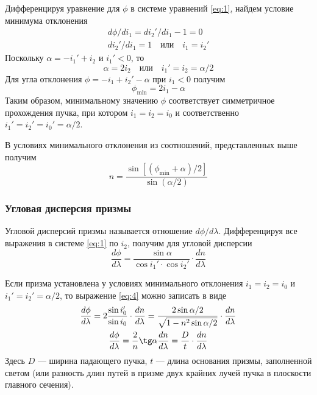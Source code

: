 \documentclass[a4paper, 12pt]{article}
\begin{document}
Дифференцируя уравнение для $\phi$ в системе уравнений \eqref{eq:1},
найдем условие минимума отклонения
\begin{equation*}
    \begin{aligned}
        d\phi/di_1 = di_2'/di_1 - 1 = 0 \\
        di_2'/di_1 = 1\quad \text{или}\quad i_1 = i_2'
    \end{aligned}
\end{equation*}
Поскольку $\alpha = -i_1'+i_2$ и $i_1' < 0$, то
\[
    \alpha = 2i_2\quad \text{или}\quad i_1' = i_2 = \alpha/2
\]
Для угла отклонения $\phi = -i_1 + i_2' - \alpha$ при $i_1 < 0$ получим
\begin{equation}
    \phi_\text{min} = 2i_1 - \alpha
    \label{eq:2}
\end{equation}
Таким образом, минимальному значению $\phi$ соответствует симметричное
прохождения пучка, при котором $i_1=i_2=i_0$ и соответственно
$i_1'=i_2'=i_0' = \alpha/2$.

В условиях минимального отклонения из соотношений, представленных выше
получим
\begin{equation}
    n = \frac{\sin \left[(\phi_\text{min} + \alpha)/2
    \right]}{\sin(\alpha/2)}
    \label{eq:3}
\end{equation}

\subsubsection*{Угловая дисперсия призмы}
Угловой дисперсий призмы называется отношение $d\phi/d\lambda$.
Дифференцируя все выражения в системе \eqref{eq:1} по $i_2$, получим
для угловой дисперсии
\begin{equation}
    \frac{d\phi}{d\lambda} = \frac{\sin\alpha}{\cos i_1' \cdot \cos
    i_2'} \cdot \frac{dn}{d\lambda}
    \label{eq:4}
\end{equation}

Если призма установлена у условиях минимального отклонения $i_1=i_2 =
i_0$ и $i_1'=i_2'=\alpha/2$, то выражение \eqref{eq:4} можно записать
в виде
\begin{gather}
    \frac{d\phi}{d\lambda} = 2 \frac{\sin i_0'}{\sin i_0} \cdot
    \frac{dn}{d\lambda} =
    \frac{2\sin\alpha/2}{\sqrt{1-n^2\sin\alpha/2}}\cdot
    \frac{dn}{d\lambda} 
    \label{eq:5} \\
    \frac{d\phi}{d\lambda} = \frac{2}{n} \tg\alpha \frac{dn}{d\lambda}
    = \frac{D}{t} \cdot \frac{dn}{d\lambda} \label{eq:6}
\end{gather}
Здесь $D$ --- ширина падающего пучка, $t$ --- длина основания призмы,
заполненной светом (или разность длин путей в призме двух крайних
лучей пучка в плоскости главного сечения).
\end{document}
